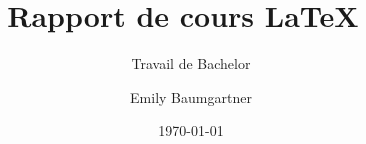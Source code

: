 \author{Emily Baumgartner}


\title{Rapport de cours \LaTeX~}

\subtitle{Travail de Bachelor}


\date{\today}


